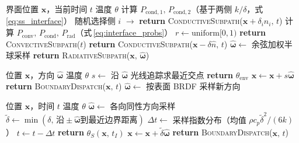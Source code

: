 \begin{algorithm}
\caption{界面分发子例程（BND）}
\label{alg:bnd}
\begin{algorithmic}[1]
\REQUIRE 界面位置 $\mathbf{x}$，当前时间 $t$
\ENSURE 温度 $\theta$
  \STATE 计算 $P_{\text{cond},1},\,P_{\text{cond},2}$（基于两侧 $k/\delta$，式\,\eqref{eq:ss_interface}）
  \STATE 随机选择侧 $i$ $\rightarrow$ \textbf{return} \textsc{ConductiveSubpath}($\mathbf{x} + \delta_i\hat{n}_i,\,t$)
  \STATE 计算 $P_\text{conv},\,P_\text{cond},\,P_\text{rad}$（式\,\eqref{eq:interface_probs}）
  \STATE $r \leftarrow \mathrm{uniform}[0,1)$
    \STATE \textbf{return} \textsc{ConvectiveSubpath}($t$)
    \STATE \textbf{return} \textsc{ConductiveSubpath}($\mathbf{x} - \delta\hat{n},\,t$)
  \ELSE
    \STATE $\hat{\boldsymbol{\omega}} \leftarrow$ 余弦加权半球采样
    \STATE \textbf{return} \textsc{RadiativeSubpath}($\mathbf{x},\,\hat{\boldsymbol{\omega}}$)
  \ENDIF
\ENDIF
\end{algorithmic}
\end{algorithm}

\begin{algorithm}
\caption{辐射子路径（RAD）}
\label{alg:rad}
\begin{algorithmic}[1]
\REQUIRE 位置 $\mathbf{x}$，方向 $\hat{\boldsymbol{\omega}}$
\ENSURE 温度 $\theta$
\LOOP
  \STATE $s \leftarrow$ 沿 $\hat{\boldsymbol{\omega}}$ 光线追踪求最近交点
    \STATE \textbf{return} $\theta_\mathrm{env}$ 
  \ENDIF
  \STATE $\mathbf{x} \leftarrow \mathbf{x} + s\hat{\boldsymbol{\omega}}$
  \IF{$\mathrm{uniform}[0,1) < \varepsilon(\mathbf{x})$}
    \STATE \textbf{return} \textsc{BoundaryDispatch}($\mathbf{x},\,t$) 
  \ELSE
    \STATE $\hat{\boldsymbol{\omega}} \leftarrow$ 按表面 BRDF 采样新方向 
  \ENDIF
\ENDLOOP
\end{algorithmic}
\end{algorithm}

\begin{algorithm}
\caption{传导子路径（CND）}
\label{alg:cnd}
\begin{algorithmic}[1]
\REQUIRE 位置 $\mathbf{x}$，时间 $t$
\ENSURE 温度 $\theta$
\LOOP
  \STATE $\hat{\boldsymbol{\omega}} \leftarrow$ 各向同性方向采样
  \STATE $\tilde{\delta} \leftarrow \min(\delta,\,\text{沿}\pm\hat{\boldsymbol{\omega}}\text{到最近边界距离})$
  \STATE $\Delta t \leftarrow$ 采样指数分布（均值 $\rho c_p \tilde{\delta}^2 / (6k)$）
  \STATE $t \leftarrow t - \Delta t$ 
    \STATE \textbf{return} $\theta_S(\mathbf{x},\,t_I)$ 
  \ENDIF
  \STATE $\mathbf{x} \leftarrow \mathbf{x} + \tilde{\delta}\hat{\boldsymbol{\omega}}$
    \STATE \textbf{return} \textsc{BoundaryDispatch}($\mathbf{x},\,t$) 
  \ENDIF
\ENDLOOP
\end{algorithmic}
\end{algorithm}

